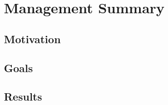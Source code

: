 \chapter*{Management Summary}
\label{ch:management_summary}

\section*{Motivation}


\section*{Goals}


\section*{Results}